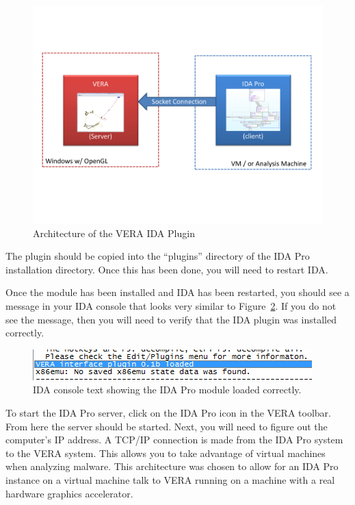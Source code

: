 \documentclass[11pt]{article}
\begin{document}
\begin{figure}[htb]
  \centering
  \includegraphics[width=5.0in]{architecture.pdf}
  \caption{Architecture of the VERA IDA Plugin}\label{fig:vera-ida-arch}
\end{figure}

The plugin should be copied into the ``plugins'' directory of the
IDA Pro installation directory. Once this has been done, you will need
to restart IDA.   

Once the module has been installed and IDA has been restarted, you
should see a message in your IDA console that looks very similar to
Figure~\ref{fig:vera_plugin}. If you do not see the message, then you
will need to verify that the IDA plugin was installed correctly. 

\begin{figure}[htb]
  \centering
  \includegraphics{vera-ida-text.png}
  \caption{IDA console text showing the IDA Pro module loaded correctly.}\label{fig:vera_plugin}
\end{figure}

To start the IDA Pro server, click on the IDA Pro icon in the VERA toolbar. From here the server should be started. Next, you will need to figure out the computer's IP address. A TCP/IP connection is made from the IDA Pro system to the VERA system. This allows you to take advantage of virtual machines when analyzing malware. This architecture was chosen to allow for an IDA Pro instance on a virtual machine talk to VERA running on a machine with a real hardware graphics accelerator. 


\newpage
%
\end{document}
